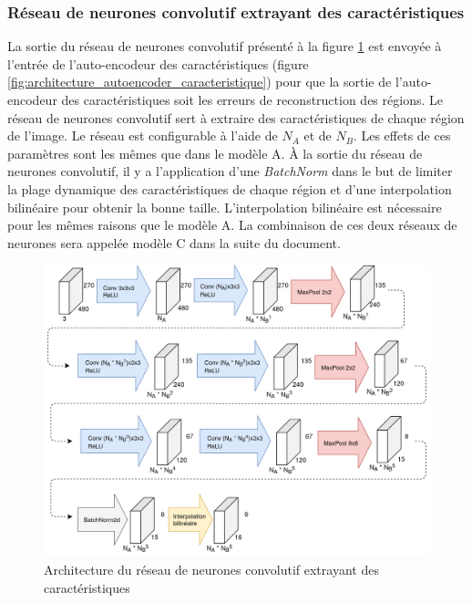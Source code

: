 \subsubsection{Réseau de neurones convolutif extrayant des caractéristiques}
    La sortie du réseau de neurones convolutif présenté à la figure \ref{fig:architecture_small_cnn} est envoyée à l'entrée de l'auto-encodeur des caractéristiques (figure \ref{fig:architecture_autoencoder_caracteristique}) pour que la sortie de l'auto-encodeur des caractéristiques soit les erreurs de reconstruction des régions. Le réseau de neurones convolutif sert à extraire des caractéristiques de chaque région de l'image. Le réseau est configurable à l'aide de \(N_A\) et de \(N_B\). Les effets de ces paramètres sont les mêmes que dans le modèle A. À la sortie du réseau de neurones convolutif, il y a l'application d'une \textit{BatchNorm} dans le but de limiter la plage dynamique des caractéristiques de chaque région et d'une interpolation bilinéaire pour obtenir la bonne taille. L'interpolation bilinéaire est nécessaire pour les mêmes raisons que le modèle A. La combinaison de ces deux réseaux de neurones sera appelée modèle C dans la suite du document.
    \begin{figure}
        \centering
        \includegraphics[width=17cm]{images/Architecture_SmallCnnWithAutoencoder.png}
        \caption{Architecture du réseau de neurones convolutif extrayant des caractéristiques}
        \label{fig:architecture_small_cnn}
    \end{figure}

